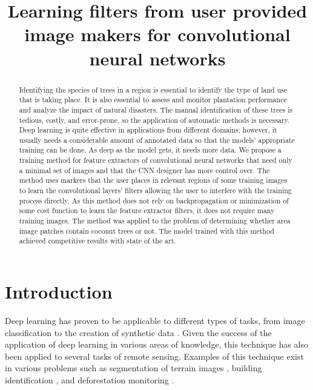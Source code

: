 \documentclass[a4paper,conference]{IEEEtran}
\begin{document}
\title{Learning filters from user provided image makers for convolutional neural networks}

\maketitle

\begin{abstract}
  Identifying the species of trees in a region is essential to identify the type of land use that is taking place. It is also essential to assess and monitor plantation performance and analyze the impact of natural disasters. The manual identification of these trees is tedious, costly, and error-prone, so the application of automatic methods is necessary. Deep learning is quite effective in applications from different domains; however, it usually needs a considerable amount of annotated data so that the models' appropriate training can be done. As deep as the model gets, it needs more data. We propose a training method for feature extractors of convolutional neural networks that need only a minimal set of images and that the CNN designer has more control over. The method uses markers that the user places in relevant regions of some training images to learn the convolutional layers' filters allowing the user to interfere with the training process directly. As this method does not rely on backpropagation or minimization of some cost function to learn the feature extractor filters, it does not require many training images. The method was applied to the problem of determining whether area image patches contain coconut trees or not. The model trained with this method achieved competitive results with state of the art.
\end{abstract}

\section{Introduction}
Deep learning has proven to be applicable to different types of tasks, from image classification to the creation of synthetic data \cite{goodfellow2016deep}. Given the success of the application of deep learning in various areas of knowledge, this technique has also been applied to several tasks of remote sensing. Examples of this technique exist in various problems such as segmentation of terrain images \cite{kemker2018algorithms, kampffmeyer2016semantic, hamaguchi2018effective}, building identification \cite{xu2018building, lu2018detecting, liu2018multilevel}, and deforestation monitoring \cite{bragilevsky2017deep}. 
\end{document}
